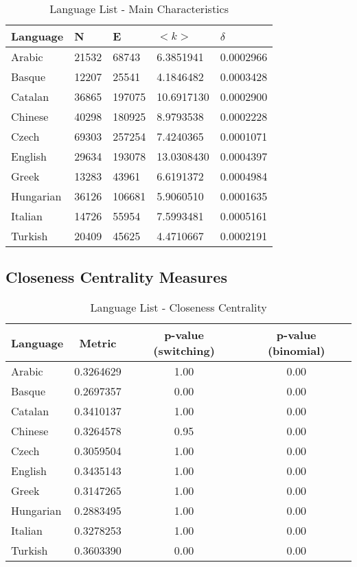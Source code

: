 \documentclass[12pt, a4paper]{article}
\begin{document}
\begin{table}[H]
    \centering
    \begin{tabular}{l l l l l}
    Language & N & E & $<k>$ & $\delta$ \\
     \hline
    Arabic & 21532 & 68743 & 6.3851941 & 0.0002966 \\
    Basque & 12207 & 25541 & 4.1846482 & 0.0003428 \\
    Catalan & 36865 & 197075 & 10.6917130 & 0.0002900 \\
    Chinese & 40298 & 180925 & 8.9793538 & 0.0002228 \\
    Czech & 69303 & 257254 & 7.4240365 & 0.0001071 \\
    English & 29634 & 193078 & 13.0308430 & 0.0004397 \\
    Greek & 13283 & 43961 & 6.6191372 & 0.0004984 \\
    Hungarian & 36126 & 106681 & 5.9060510 & 0.0001635 \\
    Italian & 14726 & 55954 & 7.5993481 & 0.0005161 \\
    Turkish & 20409 & 45625 & 4.4710667 & 0.0002191 \\
    \end{tabular}
   \caption{Language List - Main Characteristics}
   \label{table:1}
\end{table}

\subsection{Closeness Centrality Measures}

\begin{table}[H]
  \centering
  \begin{tabular}{l c c c}
  Language & Metric & p-value (switching) & p-value (binomial)\\
   \hline
   Arabic & 0.3264629  & 1.00 & 0.00 \\
   Basque & 0.2697357  & 0.00 & 0.00 \\
   Catalan & 0.3410137 & 1.00 & 0.00 \\
   Chinese & 0.3264578 & 0.95& 0.00 \\
   Czech & 0.3059504 & 1.00 & 0.00 \\
   English & 0.3435143  & 1.00 & 0.00 \\
   Greek & 0.3147265  & 1.00 & 0.00 \\
   Hungarian & 0.2883495 & 1.00 & 0.00 \\
   Italian & 0.3278253 & 1.00 & 0.00 \\
   Turkish & 0.3603390  & 0.00 & 0.00 \\
     \end{tabular}
 \caption{Language List - Closeness Centrality}
 \label{table:2}
\end{table}
\end{document}
